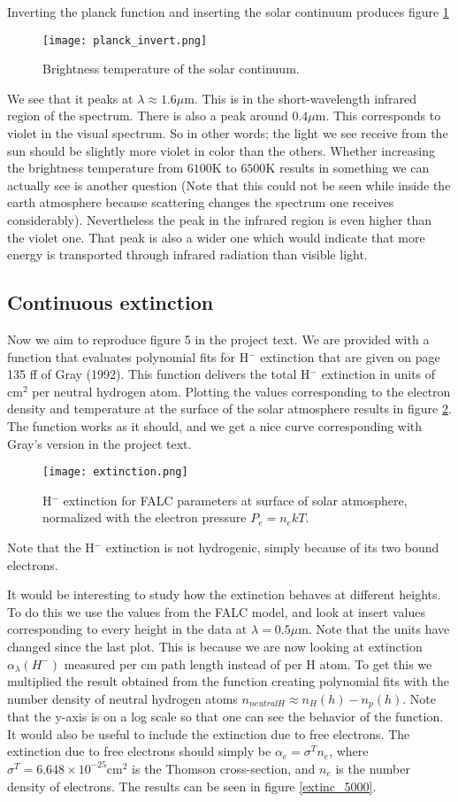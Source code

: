 \documentclass{aa}   %
\begin{document}
Inverting the planck function and inserting the solar continuum produces figure \ref{planck_invert}
\begin{figure}
 \texttt{[image: planck\_invert.png]}
 \caption{Brightness temperature of the solar continuum.}
 \label{planck_invert} 
\end{figure}
We see that it peaks at $\lambda \approx 1.6 \mu$m.
This is in the short-wavelength infrared region of the spectrum. There is also a peak around $0.4 \mu$m. This corresponds to violet in the visual spectrum. So in other words; the light we see receive from the sun should be slightly more violet in color than the others. Whether increasing the brightness temperature from $6100$K to $6500$K results in something we can actually see is another question (Note that this could not be seen while inside the earth atmosphere because scattering changes the spectrum one receives considerably). Nevertheless the peak in the infrared region is even higher than the violet one. That peak is also a wider one which would indicate that more energy is transported through infrared radiation than visible light.
\subsection{Continuous extinction}
Now we aim to reproduce figure 5 in the project text. We are provided with a function that evaluates polynomial fits for H$^-$ extinction that are given on page 135 ff of Gray (1992). This function delivers the total H$^-$ extinction in units of cm$^2$ per neutral hydrogen atom. Plotting the values corresponding to the electron density and temperature at the surface of the solar atmosphere results in figure \ref{extinction}. The function works as it should, and we get a nice curve corresponding with Gray's version in the project text.
\begin{figure}
 \texttt{[image: extinction.png]}
 \caption{H$^-$ extinction for FALC parameters at surface of solar atmosphere, normalized with the electron pressure $P_e =n_e kT$.}
 \label{extinction} 
\end{figure}
Note that the H$^-$ extinction is not hydrogenic, simply because of its two bound electrons.

It would be interesting to study how the extinction behaves at different heights.
To do this we use the values from the FALC model, and look at insert values corresponding to every height in the data at $\lambda = 0.5 \mu$m.  Note that the units have changed since the last plot. This is because we are now looking at extinction $\alpha_\lambda(H^-)$ measured per cm path length instead of per H atom. To get this we multiplied the result obtained from the function creating polynomial fits with the number density of neutral hydrogen atoms $n_{neutral H} \approx n_H(h) - n_p(h)$. Note that the y-axis is on a log scale so that one can see the behavior of the function. It would also be useful to include the extinction due to free electrons. The extinction due to free electrons should simply be $\alpha_e = \sigma^T n_e$, where $\sigma^T = 6.648\times 10^{-25}$cm$^2$ is the Thomson cross-section, and $n_e$ is the number density of electrons. 
The results can be seen in figure \ref{extinc_5000}.
\end{document}
